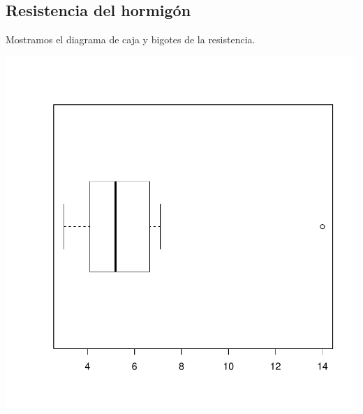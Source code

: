 \documentclass [a4paper] {article}
\begin{document}
\subsection{Resistencia del hormigón}
Mostramos el diagrama de caja y bigotes de la resistencia.
\begin{center}
\includegraphics{entrega-plot_caja_bigotes_resistencia}
\end{center}
\end{document}
